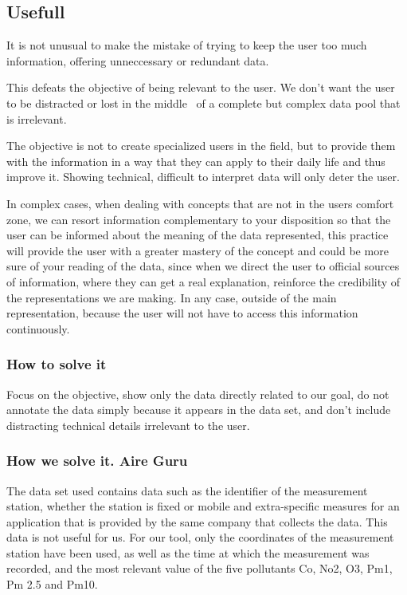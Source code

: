 \subsection{Usefull}
It is not unusual to make the mistake of trying to keep the user too much information, offering unneccessary or redundant data.
 
This defeats the objective of being relevant to the user. We don't want the user to be distracted or lost in the middle
 of a complete but complex data pool that is irrelevant.

The objective is not to create specialized users in the field, but to provide them with the
information in a way that they can apply to their daily life and thus improve it. Showing
technical, difficult to interpret data will only deter the user. 

In complex cases, when dealing with concepts that are not in the users comfort zone, we can resort information
complementary to your disposition so that the user can be informed about the meaning of the data
represented, this practice will provide the user with a greater mastery of the concept and could be more
sure of your reading of the data, since when we direct the user to official sources of information, where they can
get a real explanation, reinforce the credibility of the representations we are making. In any case,
outside of the main representation, because the user will not have to access this information continuously.

\subsubsection{How to solve it} 
Focus on the objective, show only the data directly related to our goal, do not annotate the data
simply because it appears in the data set, and don't include distracting technical details irrelevant to the user.

\subsubsection{How we solve it. Aire Guru} 

The data set used contains data such as the identifier of the measurement station, whether the station is fixed or mobile
and extra-specific measures for an application that is provided by the same company that collects the data. This data is not useful for us.
For our tool, only the coordinates of the measurement station have been used, as well as the time at which the measurement was recorded, and the most relevant value of the five pollutants Co, No2, O3, Pm1, Pm 2.5 and Pm10.

